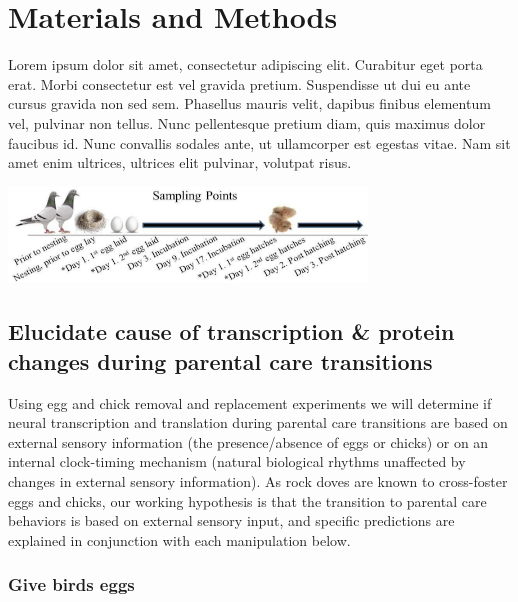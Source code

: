 \documentclass[10pt,letterpaper]{article}
\begin{document}
\hypertarget{materials-and-methods}{%
\section{Materials and Methods}\label{materials-and-methods}}

Lorem ipsum dolor sit amet, consectetur adipiscing elit. Curabitur eget
porta erat. Morbi consectetur est vel gravida pretium. Suspendisse ut
dui eu ante cursus gravida non sed sem. Phasellus mauris velit, dapibus
finibus elementum vel, pulvinar non tellus. Nunc pellentesque pretium
diam, quis maximus dolor faucibus id. Nunc convallis sodales ante, ut
ullamcorper est egestas vitae. Nam sit amet enim ultrices, ultrices elit
pulvinar, volutpat risus.

\includegraphics[width=360px]{../figures/images/samplingtimepoints}

\hypertarget{elucidate-cause-of-transcription-protein-changes-during-parental-care-transitions}{%
\subsection{Elucidate cause of transcription \& protein changes during
parental care
transitions}\label{elucidate-cause-of-transcription-protein-changes-during-parental-care-transitions}}

Using egg and chick removal and replacement experiments we will
determine if neural transcription and translation during parental care
transitions are based on external sensory information (the
presence/absence of eggs or chicks) or on an internal clock-timing
mechanism (natural biological rhythms unaffected by changes in external
sensory information). As rock doves are known to cross-foster eggs and
chicks, our working hypothesis is that the transition to parental care
behaviors is based on external sensory input, and specific predictions
are explained in conjunction with each manipulation below.

\hypertarget{give-birds-eggs}{%
\subsubsection{Give birds eggs}\label{give-birds-eggs}}
\end{document}
